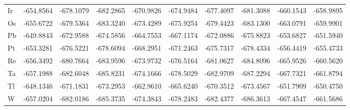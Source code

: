 \documentclass[a4paper, 12pt]{article}
\begin{document}
\begin{table}[htbp]
{\begin{tabular}{l *{9}{l}}
        Ir	& -654.8564	&-678.1079	&-682.2865	&-670.9826	&-674.9484	&-677.4097	&-681.3088	&-660.1543	&-658.9895 \\
        Os	& -655.6722	&-679.5364	&-683.3240  &-673.4289	&-675.9254	&-679.4423	&-683.1300	&-663.0791	&-659.9901 \\
        Pb	& -649.8843	&-672.9588	&-674.5856	&-664.7553	&-667.1174	&-672.0886	&-675.8823	&-653.6827	&-651.5940 \\
        Pt	& -653.3281	&-676.5221	&-678.6094	&-668.2951	&-671.2463	&-675.7317	&-678.4334	&-656.4419	&-655.4733 \\
        Re	& -656.3492	&-680.7664	&-683.9596	&-673.9732	&-676.5164	&-681.0627	&-684.8096	&-665.9526	&-660.5620 \\
        Ta	& -657.1988	&-682.6048	&-685.8231	&-674.1666	&-678.5029	&-682.9709	&-687.2294	&-667.7321	&-661.8794 \\
        Tl	& -648.1346	&-671.1831	&-673.2953	&-662.9610  &-665.6240  &-670.3512	&-673.4567	&-651.7909	&-650.4750 \\
        W	  & -657.0204	&-682.0186	&-685.3735	&-674.3843	&-678.2483	&-682.4377	&-686.3613	&-667.4547	&-661.5686 \\
        \bottomrule
      \end{tabular}
    }
\end{table}
\end{document}
